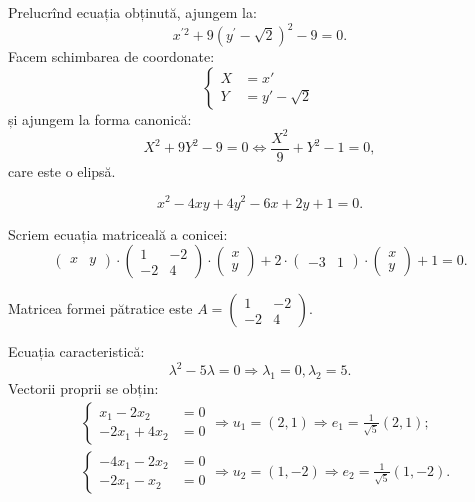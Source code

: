 Prelucrînd ecuația obținută, ajungem la:
\[
  x^{\prime 2} + 9(y^\prime - \sqrt{2})^2 - 9 = 0.
\]
Facem schimbarea de coordonate:
\[
  \begin{cases}
    X &= x' \\
    Y &= y' - \sqrt{2}
  \end{cases}
\]
și ajungem la forma canonică:
\[
  X^2 + 9Y^2 - 9 = 0 \Leftrightarrow \frac{X^2}{9} + Y^2 - 1 = 0,
\]
care este o elipsă.

\vspace{1cm}

\[
  x^2 - 4xy + 4y^2 - 6x + 2y + 1 = 0.
\]

Scriem ecuația matriceală a conicei:
\[
  \begin{pmatrix}
    x & y
  \end{pmatrix} \cdot
  \begin{pmatrix}
    1 & -2 \\
    -2 & 4
  \end{pmatrix} \cdot
  \begin{pmatrix}
    x \\ y
  \end{pmatrix} + 2 \cdot
  \begin{pmatrix}
    -3 & 1  \end{pmatrix} \cdot
  \begin{pmatrix}
    x \\ y
  \end{pmatrix} + 1 = 0.
\]

Matricea formei pătratice este $A = \begin{pmatrix} 1 & -2 \\ -2 & 4 \end{pmatrix}$.

Ecuația caracteristică:
\[
  \lambda^2 - 5\lambda = 0 \Rightarrow \lambda_1 = 0, \lambda_2 = 5.
\]
Vectorii proprii se obțin:
\begin{align*}
  &\begin{cases}
    x_1 - 2x_2 &= 0 \\
    -2x_1 + 4x_2 &= 0
  \end{cases} \Rightarrow u_1 = (2, 1) \Rightarrow e_1 = \frac{1}{\sqrt{5}} (2, 1); \\
  & \begin{cases}
    -4x_1 - 2x_2 &= 0 \\
    -2x_1 - x_2 &= 0 
  \end{cases} \Rightarrow u_2 = (1, -2) \Rightarrow e_2 = \frac{1}{\sqrt{5}} (1, -2).
\end{align*}

